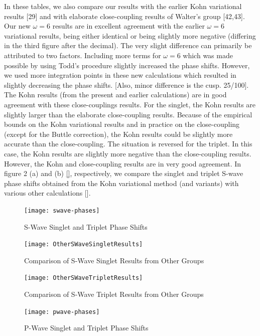 \documentclass[preprint,showpacs,preprintnumbers,amsmath,amssymb]{revtex4}
\begin{document}
In these tables, we also compare our results with the earlier Kohn
variational results [29] and with  elaborate
close-coupling results of Walter's group [42,43].
Our new $\omega=6$ results are in excellent agreement with 
the earlier $\omega =6$ variational results, being either identical or 
being  slightly more negative (differing in the third figure after
the decimal). 
The very slight difference can primarily
be attributed to two factors.
Including more terms for $\omega=6$ which was made possible
by using Todd's procedure slightly increased the phase shifts.
However, we used more integration points in these new
calculations which resulted in slightly decreasing
the phase shifts.
[Also, minor difference is the cusp. 25/100].
The Kohn results (from the present and earlier calculations) 
are in good agreement with these close-couplings results.
For the singlet, the Kohn results are slightly
larger than the elaborate close-coupling results.
Because of the empirical bounds on the
Kohn variational results and in practice on
the close-coupling (except for the Buttle
correction), the Kohn results could be
slightly more accurate than the close-coupling.
The situation is reversed for the triplet.
In this case, the Kohn results are slightly
more negative than the close-coupling results.
However, the Kohn and close-coupling results are
in very good agreement.
In figure 2 (a) and (b) \ref{}, respectively,
we compare the singlet and triplet
S-wave phase shifts obtained from the Kohn variational
method (and variants) with various other calculations [].

\begin{figure}[ht]
	\centering
	\texttt{[image: swave-phases]}
	\caption{S-Wave Singlet and Triplet Phase Shifts}
	\label{fig:swave-phases}
\end{figure}

\begin{figure}[ht]
	\centering
	\texttt{[image: OtherSWaveSingletResults]}
	\caption{Comparison of S-Wave Singlet Results from Other Groups}
	\label{fig:OtherSWaveSingletResults}
\end{figure}

\begin{figure}[ht]
	\centering
	\texttt{[image: OtherSWaveTripletResults]}
	\caption{Comparison of S-Wave Triplet Results from Other Groups}
	\label{fig:OtherSWaveTripletResults}
\end{figure}


\begin{figure}[ht]
	\centering
	\texttt{[image: pwave-phases]}
	\caption{P-Wave Singlet and Triplet Phase Shifts}
	\label{fig:pwave-phases}
\end{figure}
\end{document}
